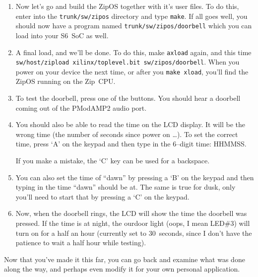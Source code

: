 \documentclass{gqtekspec}
\begin{document}
\begin{enumerate}
\item Now let's go and build the ZipOS together with it's user files.  To do
	this, enter into the {\tt trunk/sw/zipos} directory and type
	{\tt make}.  If all goes well, you should now have a program named
	{\tt trunk/sw/zipos/doorbell} which you can load into your S6~SoC as
	well.

\item A final load, and we'll be done.  To do this, make {\tt axload} again,
	and this time {\tt sw/host/zipload xilinx/toplevel.bit sw/zipos/doorbell}.
	When you power on your device the next time, or after you 
	{\tt make xload}, you'll find the ZipOS running on the Zip~CPU.

\item To test the doorbell, press one of the buttons.  You should hear a
	doorbell coming out of the PModAMP2 audio port.

\item You should also be able to read the time on the LCD display.  It will be
	the wrong time (the number of seconds since power on \ldots).  To set
	the correct time, press `A' on the keypad and then type in the 6--digit
	time: HHMMSS.

	If you make a mistake, the `C' key can be used for a backspace.

\item You can also set the time of ``dawn'' by pressing a `B' on the keypad
	and then typing in the time ``dawn'' should be at.  The same is
	true for dusk, only you'll need to start that by pressing a `C' on the
	keypad.

\item Now, when the doorbell rings, the LCD will show the time the doorbell
	was pressed.  If the time is at night, the ourdoor light (oops, I
	mean LED\#3) will turn on for a half an hour (currently set to
	30~seconds, since I don't have the patience to wait a half hour while
	testing).
\end{enumerate}

Now that you've made it this far, you can go back and examine what was done
along the way, and perhaps even modify it for your own personal application.
\end{document}
